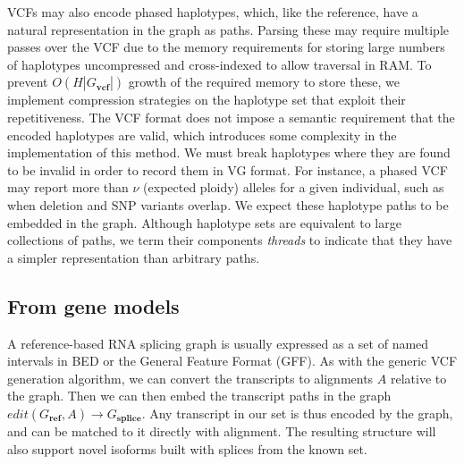 \documentclass[a4paper,12pt,numbered,oneside]{Classes/PhDThesisPSnPDF}
\begin{document}
VCFs may also encode phased haplotypes, which, like the reference, have a natural representation in the graph as paths.
Parsing these may require multiple passes over the VCF due to the memory requirements for storing large numbers of haplotypes uncompressed and cross-indexed to allow traversal in RAM.
To prevent $O(H|G_\textbf{vcf}|)$ growth of the required memory to store these, we implement compression strategies on the haplotype set that exploit their repetitiveness.
The VCF format does not impose a semantic requirement that the encoded haplotypes are valid, which introduces some complexity in the implementation of this method.
We must break haplotypes where they are found to be invalid in order to record them in VG format.
For instance, a phased VCF may report more than $\nu$ (expected ploidy) alleles for a given individual, such as when deletion and SNP variants overlap.
We expect these haplotype paths to be embedded in the graph.
Although haplotype sets are equivalent to large collections of paths, we term their components \emph{threads} to indicate that they have a simpler representation than arbitrary paths.

\subsection{From gene models} %
\label{sec:construct_from_gff}

A reference-based RNA splicing graph is usually expressed as a set of named intervals in BED or the General Feature Format (GFF).
As with the generic VCF generation algorithm, we can convert the transcripts to alignments $A$ relative to the graph.
Then we can then embed the transcript paths in the graph $edit(G_\textbf{ref}, A) \to G_\textbf{splice}$.
Any transcript in our set is thus encoded by the graph, and can be matched to it directly with alignment.
The resulting structure will also support novel isoforms built with splices from the known set.
\end{document}
